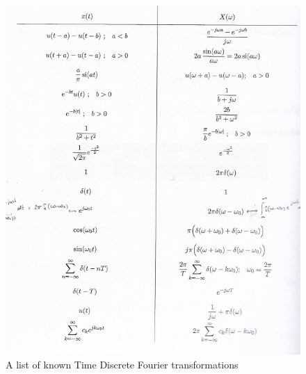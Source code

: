 \documentclass[10pt,a4paper]{article}
\begin{document}
\begin{figure}[H]
\centering
\includegraphics[scale=1]{FourierContIdentities.PNG}
\caption{A list of known Time Discrete Fourier transformations}
\end{figure}

\newpage
\end{document}
